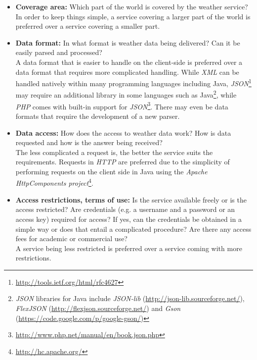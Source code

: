 \begin{itemize}
  \item \textbf{Coverage area:} Which part of the world is covered by the weather service?\\
  In order to keep things simple, a service covering a larger part of the world is preferred over a service covering a smaller part.
  
  \item \textbf{Data format:} In what format is weather data being delivered? Can it be easily parsed and processed?\\
  A data format that is easier to handle on the client-side is preferred over a data format that requires more complicated handling. While \emph{XML}\cite{XML} can be handled natively within many programming languages including Java, \emph{JSON}\footnote{\href{http://tools.ietf.org/html/rfc4627}{http://tools.ietf.org/html/rfc4627}} may require an additional library in some languages such as Java\footnote{\emph{JSON} libraries for Java include \emph{JSON-lib} (\href{http://json-lib.sourceforge.net/}{http://json-lib.sourceforge.net/}), \emph{FlexJSON} (\href{http://flexjson.sourceforge.net/}{http://flexjson.sourceforge.net/}) and \emph{Gson} (\href{https://code.google.com/p/google-gson/}{https://code.google.com/p/google-gson/})}, while \emph{PHP} comes with built-in support for \emph{JSON}\footnote{\href{http://www.php.net/manual/en/book.json.php}{http://www.php.net/manual/en/book.json.php}}. There may even be data formats that require the development of a new parser.
  
  \item \textbf{Data access:} How does the access to weather data work? How is data requested and how is the answer being received?\\
  The less complicated a request is, the better the service suits the requirements. Requests in \emph{HTTP} are preferred due to the simplicity of performing requests on the client side in Java using the \emph{Apache HttpComponents project}\footnote{\href{http://hc.apache.org/}{http://hc.apache.org/}}.
  
  \item \textbf{Access restrictions, terms of use:} Is the service available freely or is the access restricted? Are credentials (e.g. a username and a password or an access key) required for access? If yes, can the credentials be obtained in a simple way or does that entail a complicated procedure? Are there any access fees for academic or commercial use?\\
  A service being less restricted is preferred over a service coming with more restrictions.
  

\end{itemize}
